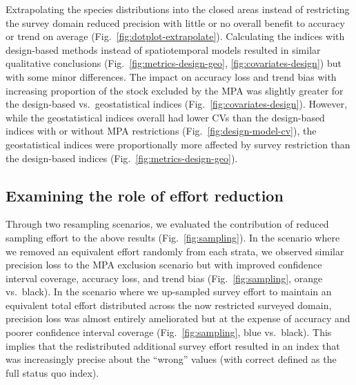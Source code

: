\documentclass[12pt]{article}
\newcommand{\R}[1]{\label{#1}\linelabel{#1}}
\begin{document}
\begin{spacing}{1.4}
Extrapolating the species distributions into the closed areas instead of restricting the survey domain reduced precision with little or no overall benefit to accuracy or trend on average (Fig.~\ref{fig:dotplot-extrapolate}).
Calculating the indices with design-based methods instead of spatiotemporal models resulted in similar qualitative conclusions (Fig.~\ref{fig:metrics-design-geo}, \ref{fig:covariates-design}) but with some minor differences.
\R{B16}The impact on accuracy loss and trend bias with increasing proportion of the stock excluded by the MPA was slightly greater for the design-based vs.\ geostatistical indices (Fig.~\ref{fig:covariates-design}).
However, while the geostatistical indices overall had lower CVs than the design-based indices with or without MPA restrictions (Fig.~\ref{fig:design-model-cv}), the geostatistical indices were proportionally more affected by survey restriction than the design-based indices (Fig.~\ref{fig:metrics-design-geo}).

\subsection*{Examining the role of effort reduction}

Through two resampling scenarios, we evaluated the contribution of reduced sampling effort to the above results (Fig.~\ref{fig:sampling}).
In the scenario where we removed an equivalent effort randomly from each strata, we observed similar precision loss to the MPA exclusion scenario but with improved confidence interval coverage, accuracy loss, and trend bias (Fig.~\ref{fig:sampling}, orange vs.\ black).
In the scenario where we up-sampled survey effort to maintain an equivalent total effort distributed across the now restricted surveyed domain,
precision loss was almost entirely ameliorated but at the expense of accuracy and poorer confidence interval coverage (Fig.~\ref{fig:sampling}, blue vs.\ black).
This implies that the redistributed additional survey effort resulted in an index that was increasingly precise about the ``wrong'' values (with correct defined as the full status quo index).


\end{spacing}
\end{document}
